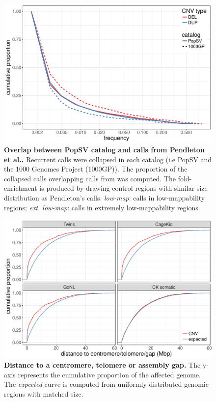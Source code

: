 \begin{figure}[htp]
  \centering
  \includegraphics[width=\linewidth,page=3]{figures/PopSV-catalog-overview.pdf}
  \caption[Overlap between {\sf PopSV} catalog and calls from Pendleton et al..]{{\bf Overlap between {\sf PopSV} catalog and calls from Pendleton et al..} {\small Recurrent calls were collapsed in each catalog (i.e {\sf PopSV} and the 1000 Genomes Project (1000GP)). The proportion of the collapsed calls overlapping calls from \citet{Pendleton2015} was computed. The fold-enrichment is produced by drawing control regions with similar size distribution as Pendleton's calls. {\it low-map}: calls in low-mappability regions; {\it ext. low-map}: calls in extremely low-mappability regions.}}
  \label{fig:pendcat}
\end{figure}

\begin{figure}[htp]
  \centering
  \includegraphics[width=\textwidth,page=1]{figures/PopSV-repeatEnr.pdf}
  \caption[Distance to a centromere, telomere or assembly gap.]{{\bf Distance to a centromere, telomere or assembly gap.} {\small The y-axis represents the cumulative proportion of the affected genome. The {\it expected} curve is computed from uniformly distributed genomic regions with matched size.}}
  \label{fig:ctgDist}
\end{figure}

